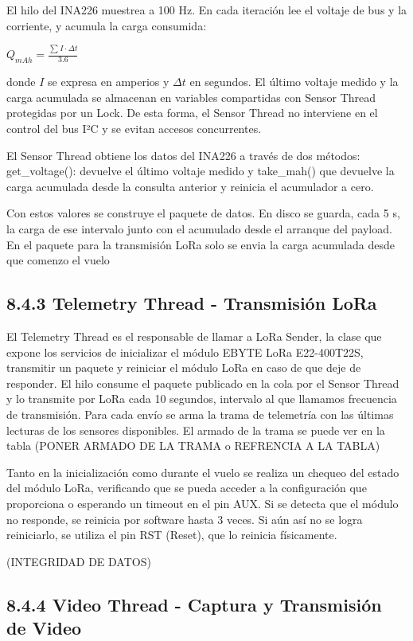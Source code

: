 \documentclass[12pt,a4paper]{article}
\begin{document}
El hilo del INA226 muestrea a 100 Hz. En cada iteración lee el voltaje de bus y la corriente, y acumula la carga consumida:

\(Q_{mAh} = \frac{\sum_{}^{}I \cdot \Delta t}{3.6}\)

donde \(I\) se expresa en amperios y \(\Delta t\) en segundos. El último voltaje medido y la carga acumulada se almacenan en variables compartidas con Sensor Thread protegidas por un Lock. De esta forma, el Sensor Thread no interviene en el control del bus I²C y se evitan accesos concurrentes.

El Sensor Thread obtiene los datos del INA226 a través de dos métodos: get\_voltage(): devuelve el último voltaje medido y take\_mah() que devuelve la carga acumulada desde la consulta anterior y reinicia el acumulador a cero.

Con estos valores se construye el paquete de datos. En disco se guarda, cada 5 s, la carga de ese intervalo junto con el acumulado desde el arranque del payload. En el paquete para la transmisión LoRa solo se envia la carga acumulada desde que comenzo el vuelo

\subsection{8.4.3 Telemetry Thread - Transmisión LoRa}\label{telemetry-thread---transmisiuxf3n-lora}

El Telemetry Thread es el responsable de llamar a LoRa Sender, la clase que expone los servicios de inicializar el módulo EBYTE LoRa E22-400T22S, transmitir un paquete y reiniciar el módulo LoRa en caso de que deje de responder. El hilo consume el paquete publicado en la cola por el Sensor Thread y lo transmite por LoRa cada 10 segundos, intervalo al que llamamos frecuencia de transmisión. Para cada envío se arma la trama de telemetría con las últimas lecturas de los sensores disponibles. El armado de la trama se puede ver en la tabla (PONER ARMADO DE LA TRAMA o REFRENCIA A LA TABLA)

Tanto en la inicialización como durante el vuelo se realiza un chequeo del estado del módulo LoRa, verificando que se pueda acceder a la configuración que proporciona o esperando un timeout en el pin AUX. Si se detecta que el módulo no responde, se reinicia por software hasta 3 veces. Si aún así no se logra reiniciarlo, se utiliza el pin RST (Reset), que lo reinicia físicamente.

(INTEGRIDAD DE DATOS)

\subsection{8.4.4 Video Thread - Captura y Transmisión de Video}\label{video-thread---captura-y-transmisiuxf3n-de-video}
\end{document}
